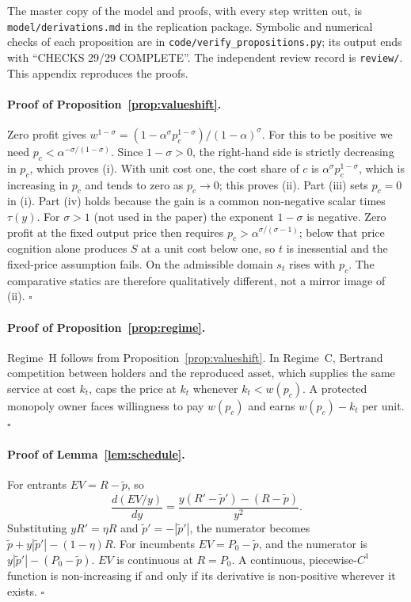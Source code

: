 \documentclass[12pt]{article}
\theoremstyle{remark}
\begin{document}
The master copy of the model and proofs, with every step written out, is \texttt{model/derivations.md} in the replication package. Symbolic and numerical checks of each proposition are in \texttt{code/verify\_propositions.py}; its output ends with ``CHECKS 29/29 COMPLETE''. The independent review record is \texttt{review/}. This appendix reproduces the proofs.

\paragraph{Proof of Proposition~\ref{prop:valueshift}.} Zero profit gives $w^{1-\sigma}=(1-\alpha^\sigma p_c^{1-\sigma})/(1-\alpha)^\sigma$. For this to be positive we need $p_c<\alpha^{-\sigma/(1-\sigma)}$. Since $1-\sigma>0$, the right-hand side is strictly decreasing in $p_c$, which proves (i). With unit cost one, the cost share of $c$ is $\alpha^\sigma p_c^{1-\sigma}$, which is increasing in $p_c$ and tends to zero as $p_c\to0$; this proves (ii). Part (iii) sets $p_c=0$ in (i). Part (iv) holds because the gain is a common non-negative scalar times $\tau(y)$. For $\sigma>1$ (not used in the paper) the exponent $1-\sigma$ is negative. Zero profit at the fixed output price then requires $p_c>\alpha^{\sigma/(\sigma-1)}$; below that price cognition alone produces $S$ at a unit cost below one, so $t$ is inessential and the fixed-price assumption fails. On the admissible domain $s_t$ rises with $p_c$. The comparative statics are therefore qualitatively different, not a mirror image of (ii). $\square$

\paragraph{Proof of Proposition~\ref{prop:regime}.} Regime~H follows from Proposition~\ref{prop:valueshift}. In Regime~C, Bertrand competition between holders and the reproduced asset, which supplies the same service at cost $k_t$, caps the price at $k_t$ whenever $k_t<w(p_c)$. A protected monopoly owner faces willingness to pay $w(p_c)$ and earns $w(p_c)-k_t$ per unit. $\square$

\paragraph{Proof of Lemma~\ref{lem:schedule}.} For entrants $EV=R-\tilde p$, so
\[
\frac{d(EV/y)}{dy}=\frac{y(R'-\tilde p')-(R-\tilde p)}{y^2}.
\]
Substituting $yR'=\eta R$ and $\tilde p'=-|\tilde p'|$, the numerator becomes $\tilde p+y|\tilde p'|-(1-\eta)R$. For incumbents $EV=P_0-\tilde p$, and the numerator is $y|\tilde p'|-(P_0-\tilde p)$. $EV$ is continuous at $R=P_0$. A continuous, piecewise-$C^1$ function is non-increasing if and only if its derivative is non-positive wherever it exists. $\square$
\end{document}
